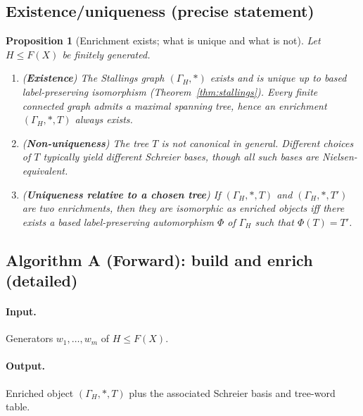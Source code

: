 \documentclass[11pt]{article}
\newtheorem{proposition}[theorem]{Proposition}
\theoremstyle{definition}
\theoremstyle{plain}
\theoremstyle{remark}
\begin{document}
\subsection*{Existence/uniqueness (precise statement)}
\begin{proposition}[Enrichment exists; what is unique and what is not]\label{prop:enriched}
Let $H\le F(X)$ be finitely generated.
\begin{enumerate}[leftmargin=2.2em]
\item (\textbf{Existence}) The Stallings graph $(\Gamma_H,*)$ exists and is unique up to based label-preserving isomorphism (Theorem~\ref{thm:stallings}).
Every finite connected graph admits a maximal spanning tree, hence an enrichment $(\Gamma_H,*,T)$ always exists.

\item (\textbf{Non-uniqueness}) The tree $T$ is not canonical in general.
Different choices of $T$ typically yield different Schreier bases, though all such bases are Nielsen-equivalent.

\item (\textbf{Uniqueness relative to a chosen tree}) If $(\Gamma_H,*,T)$ and $(\Gamma_H,*,T')$ are two enrichments,
then they are isomorphic as enriched objects iff there exists a based label-preserving automorphism $\Phi$ of $\Gamma_H$ such that $\Phi(T)=T'$.
\end{enumerate}
\end{proposition}

\subsection*{Algorithm A (Forward): build and enrich (detailed)}\cite{schreier1927,stallings1983,serre1980trees}
\paragraph{Input.} Generators $w_1,\dots,w_m$ of $H\le F(X)$.
\paragraph{Output.} Enriched object $(\Gamma_H,*,T)$ plus the associated Schreier basis and tree-word table.
\end{document}
